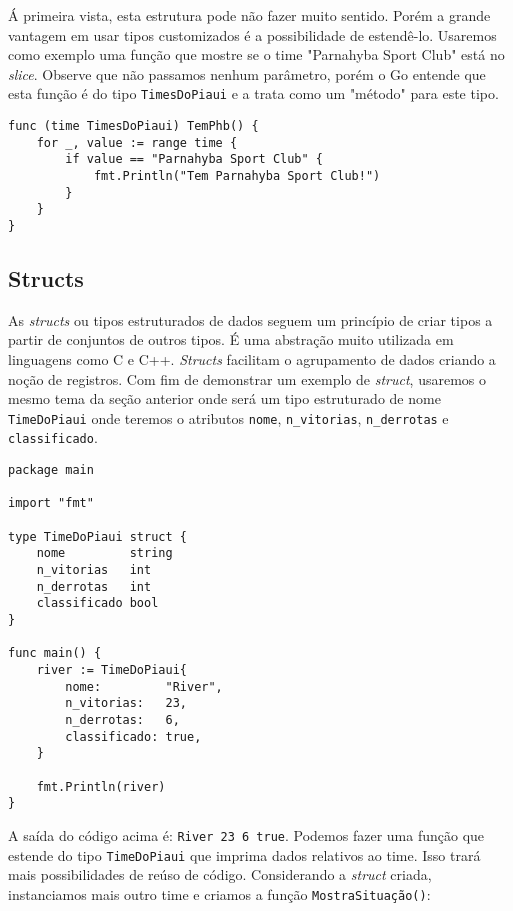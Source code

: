 \documentclass{SBCbookchapter}
\begin{document}
Á primeira vista, esta estrutura pode não fazer muito sentido. Porém a grande vantagem em usar tipos customizados é a possibilidade de estendê-lo. Usaremos como exemplo uma função que mostre se o time "Parnahyba Sport Club" está no \textit{slice}. Observe que não passamos nenhum parâmetro, porém o Go entende que esta função é do tipo \texttt{TimesDoPiaui} e a trata como um "método" para este tipo.

\begin{lstlisting}
func (time TimesDoPiaui) TemPhb() {
	for _, value := range time {
		if value == "Parnahyba Sport Club" {
			fmt.Println("Tem Parnahyba Sport Club!")
		}
	}
}
\end{lstlisting}

\subsection{Structs}

As \textit{structs} ou tipos estruturados de dados seguem um princípio de criar tipos a partir de conjuntos de outros tipos. É uma abstração muito utilizada em linguagens como C e C++. \textit{Structs} facilitam o agrupamento de dados criando a noção de registros. Com fim de demonstrar um exemplo de \textit{struct}, usaremos o mesmo tema da seção anterior onde será  um tipo estruturado de nome \texttt{TimeDoPiaui} onde teremos o atributos \texttt{nome}, \texttt{n\_vitorias}, \texttt{n\_derrotas} e \texttt{classificado}.

\begin{lstlisting}
package main

import "fmt"

type TimeDoPiaui struct {
	nome         string
	n_vitorias   int
	n_derrotas   int
	classificado bool
}

func main() {
	river := TimeDoPiaui{
		nome:         "River",
		n_vitorias:   23,
		n_derrotas:   6,
		classificado: true,
	}
	
	fmt.Println(river)
}

\end{lstlisting}

A saída do código acima é: \texttt{{River 23 6 true}}. Podemos fazer uma função que estende do tipo \texttt{TimeDoPiaui} que imprima dados relativos ao time. Isso trará mais possibilidades de reúso de código. Considerando a \textit{struct} criada, instanciamos mais outro time e criamos a função \texttt{MostraSituação()}:
\end{document}
